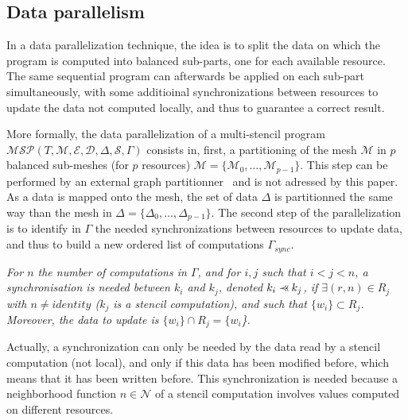 
\subsection{Data parallelism}
\label{sect:dataparal}
In a data parallelization technique, the idea is to split the data on which the program is computed into balanced sub-parts, one for each available resource. The same sequential program can afterwards be applied on each sub-part simultaneously, with some additioinal synchronizations between resources to update the data not computed locally, and thus to guarantee a correct result.

More formally, the data parallelization of a multi-stencil program $\mathcal{MSP}(T,\mathcal{M},\mathcal{E},\mathcal{D},\Delta, \mathcal{S},\Gamma)$ consists in, first, a partitioning of the mesh $\mathcal{M}$ in $p$ balanced sub-meshes (for $p$ resources) $\mathcal{M}=\{\mathcal{M}_0,\dots,\mathcal{M}_{p-1}\}$. This step can be performed by an external graph partitionner~\cite{} and is not adressed by this paper. As a data is mapped onto the mesh, the set of data $\Delta$ is partitionned the same way than the mesh in $\Delta=\{\Delta_0,\dots,\Delta_{p-1}\}$. The second step of the parallelization is to identify in $\Gamma$ the needed synchronizations between resources to update data, and thus to build a new ordered list of computations $\Gamma_{sync}$.

\begin{mydef}
\textit{
For $n$ the number of computations in $\Gamma$, and for $i,j$ such that $i<j<n$, a \textit{synchronisation} is needed between $k_i$ and $k_j$, denoted $k_i \pprec k_j$, if $\exists (r,n) \in R_j$ with $n\neq identity$ ($k_j$ is a stencil computation), and such that $\{w_i\} \subset R_j$. Moreover, the data to update is $\{w_i\} \cap R_j = \{w_i$\}.}
\end{mydef}

Actually, a synchronization can only be needed by the data read by a stencil computation (not local), and only if this data has been modified before, which means that it has been written before. This synchronization is needed because a neighborhood function $n \in \mathcal{N}$ of a stencil computation involves values computed on different resources.

